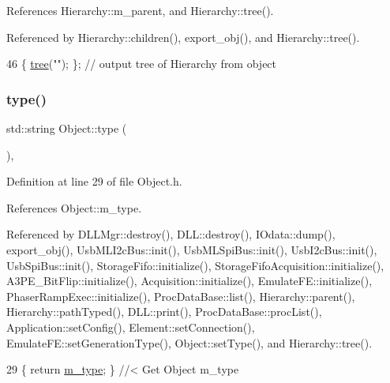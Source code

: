 References Hierarchy\+::m\+\_\+parent, and Hierarchy\+::tree().



Referenced by Hierarchy\+::children(), export\+\_\+obj(), and Hierarchy\+::tree().


\begin{DoxyCode}
46 \{ \hyperlink{classHierarchy_a594c294c5f60c230e106d522ed008212}{tree}(\textcolor{stringliteral}{""}); \};                     \textcolor{comment}{// output tree of Hierarchy from object}
\end{DoxyCode}
\mbox{\label{classObject_a84f99f70f144a83e1582d1d0f84e4e62}} 
\subsubsection{\texorpdfstring{type()}{type()}}
{\footnotesize\ttfamily std\+::string Object\+::type (\begin{DoxyParamCaption}{ }\end{DoxyParamCaption})\hspace{0.3cm}{\ttfamily [inline]}, {\ttfamily [inherited]}}



Definition at line 29 of file Object.\+h.



References Object\+::m\+\_\+type.



Referenced by D\+L\+L\+Mgr\+::destroy(), D\+L\+L\+::destroy(), I\+Odata\+::dump(), export\+\_\+obj(), Usb\+M\+L\+I2c\+Bus\+::init(), Usb\+M\+L\+Spi\+Bus\+::init(), Usb\+I2c\+Bus\+::init(), Usb\+Spi\+Bus\+::init(), Storage\+Fifo\+::initialize(), Storage\+Fifo\+Acquisition\+::initialize(), A3\+P\+E\+\_\+\+Bit\+Flip\+::initialize(), Acquisition\+::initialize(), Emulate\+F\+E\+::initialize(), Phaser\+Ramp\+Exec\+::initialize(), Proc\+Data\+Base\+::list(), Hierarchy\+::parent(), Hierarchy\+::path\+Typed(), D\+L\+L\+::print(), Proc\+Data\+Base\+::proc\+List(), Application\+::set\+Config(), Element\+::set\+Connection(), Emulate\+F\+E\+::set\+Generation\+Type(), Object\+::set\+Type(), and Hierarchy\+::tree().


\begin{DoxyCode}
29 \{ \textcolor{keywordflow}{return} \hyperlink{classObject_a457a600fe8c00eb1034374f75110a78c}{m\_type};       \} \textcolor{comment}{//< Get Object m\_type}
\end{DoxyCode}
\mbox{\label{classICECALv3_ab2a00809e9a4f2ab83ef041a886ca637}} 
